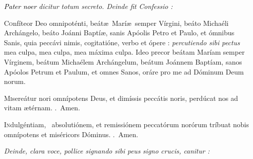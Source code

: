 \documentclass[12pt]{article} %
\def\noinitial{%
\gresetfirstlineaboveinitial{\textcolor{benred8}{\small \textsc{\textbf{}}}}{\textcolor{benred8}{\small \textsc{\textbf{}}}}
\setspaceafterinitial{0pt plus 0em minus 0em}%
\setspacebeforeinitial{0pt plus 0em minus 0em}%
\relax %
}
\newenvironment{rubric}{\vspace{1 mm}\color{benred8} \itshape \leftskip 0in \setlength{\parindent}{0.25in}}{\vspace{1 mm}}
\newenvironment{response}{\leftskip 0in \setlength{\parindent}{0in}}{\vspace{1 mm}}
\let\oldRbar\Rbar
\renewcommand{\Rbar}{\textcolor{benred8}{\oldRbar .}}
\let\oldgrealtcross\grealtcross
\renewcommand{\grealtcross}{\textcolor{benred8}{\oldgrealtcross}}
\begin{document}

\vspace{1.5mm}

\begin{rubric}
\emph{\textcolor{black}{Pater noer}} dicitur totum secreto. Deinde fit Confessio :

\end{rubric}

\begin{response}\lettrine{C}{o}nf\'{i}teor Deo omnipot\'{e}nti, be\'{a}t\ae\ Mar\'{i}\ae\ semper V\'{i}rgini, be\'{a}to Micha\'{e}li Arch\'{a}ngelo, be\'{a}to Jo\'{a}nni Bapt\'{i}\ae , sanis Ap\'{o}olis Petro et Paulo, et \'{o}mnibus Sanis, quia pecc\'{a}vi nimis, cogitati\'{o}ne, verbo et \'{o}pere : \emph{\textcolor{benred8}{percutiendo sibi pectus}} mea culpa, mea culpa, mea m\'{a}xima culpa. Ideo precor be\'{a}tam Mar\'{i}am semper V\'{i}rginem, be\'{a}tum Micha\'{e}lem Arch\'{a}ngelum, be\'{a}tum Jo\'{a}nnem Bapt\'{i}am, sanos Ap\'{o}olos Petrum et Paulum, et omnes Sanos, or\'{a}re pro me ad D\'{o}minum Deum norum.

\end{response}

\begin{response}\lettrine{M}{i}sere\'{a}tur nori omn\'{i}potens Deus, et dim\'{i}ssis pecc\'{a}tis noris, perd\'{u}cat nos ad vitam \ae t\'{e}rnam. \Rbar\ Amen.

\end{response}

\begin{response}\lettrine{I}{n}dulg\'{e}ntiam, \grealtcross\ absoluti\'{o}nem, et remissi\'{o}nem peccat\'{o}rum nor\'{o}rum tr\'{i}buat nobis omn\'{i}potens et mis\'{e}ricors D\'{o}minus. \Rbar\ Amen.

\end{response}

\begin{rubric}
Deinde, clara voce, pollice signando sibi peus signo crucis, canitur :

\end{rubric}

{\noinitial
{}

}
\end{document}
